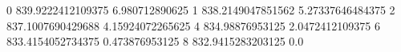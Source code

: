 0 839.9222412109375 6.980712890625
1 838.2149047851562 5.27337646484375
2 837.1007690429688 4.15924072265625
4 834.98876953125 2.0472412109375
6 833.4154052734375 0.473876953125
8 832.9415283203125 0.0
